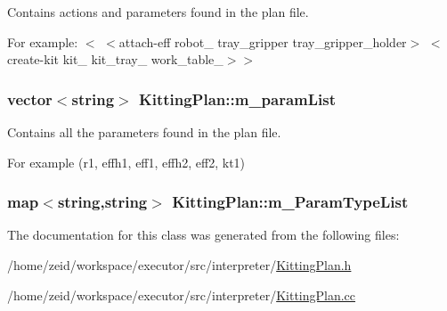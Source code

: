 Contains actions and parameters found in the plan file. 

For example: $<$ $<$attach-\/eff robot\_ tray\_\-gripper tray\_\-gripper\_\-holder$>$ $<$create-\/kit kit\_ kit\_\-tray\_ work\_\-table\_$>$$>$ \hypertarget{class_kitting_plan_aa129b8bcc7d7d9660a0eedc18fcff026}{
\subsubsection[{m\_\-paramList}]{\setlength{\rightskip}{0pt plus 5cm}vector$<$string$>$ {\bf KittingPlan::m\_\-paramList}}}
\label{class_kitting_plan_aa129b8bcc7d7d9660a0eedc18fcff026}


Contains all the parameters found in the plan file. 

For example (r1, effh1, eff1, effh2, eff2, kt1) \hypertarget{class_kitting_plan_a202e80e92752c93ea614b574c4b1fc00}{
\subsubsection[{m\_\-ParamTypeList}]{\setlength{\rightskip}{0pt plus 5cm}map$<$string,string$>$ {\bf KittingPlan::m\_\-ParamTypeList}}}
\label{class_kitting_plan_a202e80e92752c93ea614b574c4b1fc00}


The documentation for this class was generated from the following files:\begin{DoxyCompactItemize}
\item 
/home/zeid/workspace/executor/src/interpreter/\hyperlink{_kitting_plan_8h}{KittingPlan.h}\item 
/home/zeid/workspace/executor/src/interpreter/\hyperlink{_kitting_plan_8cc}{KittingPlan.cc}\end{DoxyCompactItemize}
